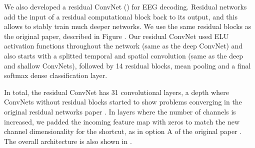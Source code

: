     We also developed a residual ConvNet (\citep{he_deep_2015})
for EEG decoding. Residual networks add the input of a residual
computational block back to its output, and this allows to stably train
much deeper networks. We use the same residual blocks as the original
paper, described in Figure . Our
residual ConvNet used ELU activation functions throughout the network
(same as the deep ConvNet) and also starts with a splitted temporal and
spatial convolution (same as the deep and shallow ConvNets), followed by
14 residual blocks, mean pooling and a final softmax dense
classification layer.

In total, the residual ConvNet has 31 convolutional layers, a depth
where ConvNets without residual blocks started to show problems
converging in the original residual networks paper
\citep{he_deep_2015}. In layers where the number of channels
is increased, we padded the incoming feature map with zeros to match the
new channel dimensionality for the shortcut, as in option A of the
original paper \citep{he_deep_2015}. The overall architecture is also shown in
.

